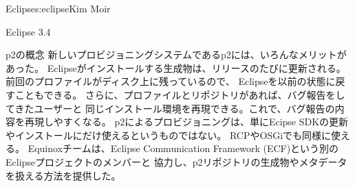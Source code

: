 \begin{aosachapter}{Eclipse}{s:eclipse}{Kim Moir}
\begin{aosasect1}{Eclipse 3.4}
\begin{aosasect2}{p2の概念}
新しいプロビジョニングシステムであるp2には、いろんなメリットがあった。
Eclipseがインストールする生成物は、リリースのたびに更新される。
前回のプロファイルがディスク上に残っているので、
Eclipseを以前の状態に戻すこともできる。
さらに、プロファイルとリポジトリがあれば、バグ報告をしてきたユーザーと
同じインストール環境を再現できる。これで、バグ報告の内容を再現しやすくなる。
p2によるプロビジョニングは、単にEcipse SDKの更新やインストールにだけ使えるというものではない。
RCPやOSGiでも同様に使える。
Equinoxチームは、Eclipse Communication Framework (ECF)という別のEclipseプロジェクトのメンバーと
協力し、p2リポジトリの生成物やメタデータを扱える方法を提供した。


\end{aosasect2}
\end{aosasect1}
\end{aosachapter}
